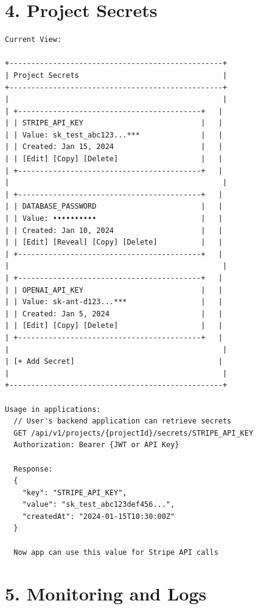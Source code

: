 \documentclass[11pt,a4paper]{report}
\begin{document}
\section{4. Project Secrets}


\begin{lstlisting}[language=text]
Current View:

+-------------------------------------------------+
| Project Secrets                                 |
+-------------------------------------------------+
|                                                 |
| +------------------------------------------+   |
| | STRIPE_API_KEY                           |   |
| | Value: sk_test_abc123...***              |   |
| | Created: Jan 15, 2024                    |   |
| | [Edit] [Copy] [Delete]                   |   |
| +------------------------------------------+   |
|                                                 |
| +------------------------------------------+   |
| | DATABASE_PASSWORD                        |   |
| | Value: ••••••••••                        |   |
| | Created: Jan 10, 2024                    |   |
| | [Edit] [Reveal] [Copy] [Delete]          |   |
| +------------------------------------------+   |
|                                                 |
| +------------------------------------------+   |
| | OPENAI_API_KEY                           |   |
| | Value: sk-ant-d123...***                 |   |
| | Created: Jan 5, 2024                     |   |
| | [Edit] [Copy] [Delete]                   |   |
| +------------------------------------------+   |
|                                                 |
| [+ Add Secret]                                 |
|                                                 |
+-------------------------------------------------+

Usage in applications:
  // User's backend application can retrieve secrets
  GET /api/v1/projects/{projectId}/secrets/STRIPE_API_KEY
  Authorization: Bearer {JWT or API Key}
  
  Response:
  {
    "key": "STRIPE_API_KEY",
    "value": "sk_test_abc123def456...",
    "createdAt": "2024-01-15T10:30:00Z"
  }
  
  Now app can use this value for Stripe API calls
\end{lstlisting}


\section{5. Monitoring and Logs}
\end{document}
